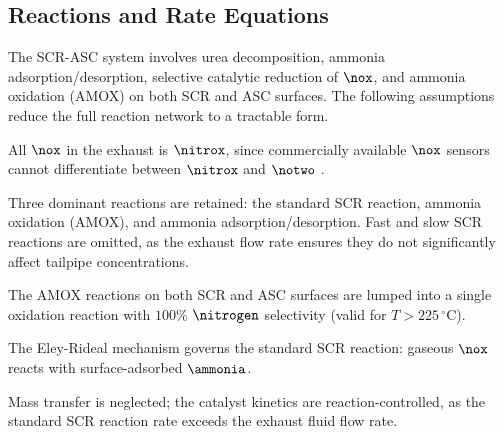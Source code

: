 \subsection{Reactions and Rate Equations}
The SCR-ASC system involves urea decomposition, ammonia adsorption/desorption, selective catalytic reduction of $\nox$,
and ammonia oxidation (AMOX) on both SCR and ASC surfaces. The following assumptions reduce the full reaction network to
a tractable form.

 All $\nox$ in the exhaust is $\nitrox$, since commercially available $\nox$ sensors cannot differentiate
between $\nitrox$ and $\notwo$ \cite{nova2014urea}.

 Three dominant reactions are retained: the standard SCR reaction, ammonia oxidation (AMOX), and ammonia
adsorption/desorption. Fast and slow SCR reactions are omitted, as the exhaust flow rate ensures they do not
significantly affect tailpipe concentrations.

 The AMOX reactions on both SCR and ASC surfaces are lumped into a single oxidation reaction with $100\%$
$\nitrogen$ selectivity (valid for $T > 225\,{}^\circ\text{C}$).

 The Eley-Rideal mechanism governs the standard SCR reaction: gaseous $\nox$ reacts with surface-adsorbed
$\ammonia$.

 Mass transfer is neglected; the catalyst kinetics are reaction-controlled, as the standard SCR reaction
rate exceeds the exhaust fluid flow rate.

